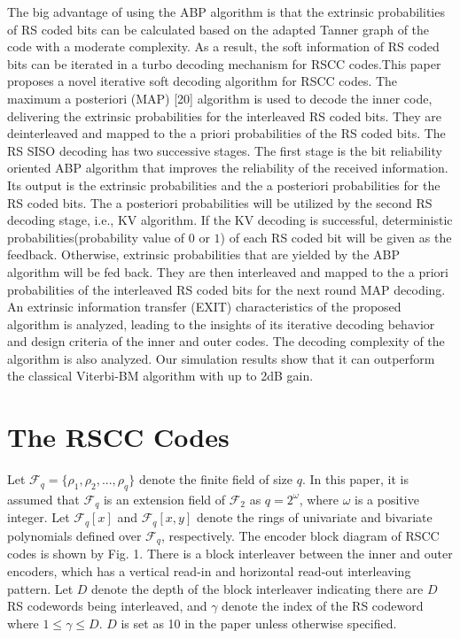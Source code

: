 \documentclass[fontsize=12pt]{article}
\begin{document}
The big advantage of using the ABP algorithm is that the
extrinsic probabilities of RS coded bits can be calculated
based on the adapted Tanner graph of the code with a
moderate complexity. As a result, the soft information of RS
coded bits can be iterated in a turbo decoding mechanism
for RSCC codes.This paper proposes a novel iterative soft
decoding algorithm for RSCC codes. The maximum a posteriori
(MAP) [20] algorithm is used to decode the inner
code, delivering the extrinsic probabilities for the interleaved
RS coded bits. They are deinterleaved and mapped to the
a priori probabilities of the RS coded bits. The RS SISO
decoding has two successive stages. The first stage is the bit
reliability oriented ABP algorithm that improves the reliability
of the received information. Its output is the extrinsic
probabilities and the a posteriori probabilities for the RS
coded bits. The a posteriori probabilities will be utilized by
the second RS decoding stage, i.e., KV algorithm. If the KV
decoding is successful, deterministic probabilities(probability value of $0$ or $1$) of each RS
coded bit will be given as the feedback. Otherwise, extrinsic
probabilities that are yielded by the ABP algorithm will be
fed back. They are then interleaved and mapped to the a
priori probabilities of the interleaved RS coded bits for the
next round MAP decoding. 
An extrinsic information transfer (EXIT) characteristics of the
proposed algorithm is analyzed, leading to the insights of its
iterative decoding behavior and design criteria of the inner
and outer codes. The decoding complexity of the algorithm
is also analyzed. Our simulation results show that it can
outperform the classical Viterbi-BM algorithm with up to 2dB
gain. 

\section{The RSCC Codes}
Let $\mathcal{F}_q = \{\rho_1, \rho_2, ...,\rho_q\}$ denote the finite field of size
$q$. In this paper, it is assumed that $\mathcal{F}_q$ is an extension field
of $\mathcal{F}_2$ as $q = 2^\omega$, where $\omega$ is a positive integer. Let $\mathcal{F}_q[x]$
and $\mathcal{F}_q[x, y]$ denote the rings of univariate and bivariate
polynomials defined over $\mathcal{F}_q$, respectively. The encoder block
diagram of RSCC codes is shown by Fig. 1. There is a block
interleaver between the inner and outer encoders, which has
a vertical read-in and horizontal read-out interleaving pattern.
Let $D$ denote the depth of the block interleaver indicating
there are $D$ RS codewords being interleaved, and $\gamma$ denote
the index of the RS codeword where $1 \leq\gamma \leq D$.  $D$ is set as 10 in the paper unless otherwise specified.
\end{document}
